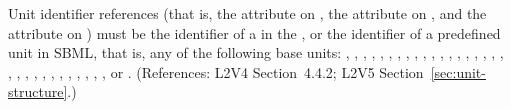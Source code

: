Unit identifier references (that is, the  attribute on \Compartment,
the  attribute on \Parameter, and the 
attribute on \Species) must be the identifier of a \UnitDefinition in the \Model, or the identifier of a predefined unit in SBML, that is, any of the following base units:  
,
,
,
,
,
,
,
,
,
,
,
,
,
,
,
,
,
,
,
,
,
,
,
,
,
,
,
,
,
,
, or
.
(References: L2V4 Section~4.4.2; L2V5 Section~\ref{sec:unit-structure}.)
